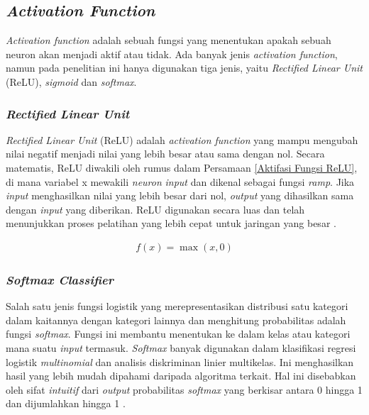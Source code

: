\subsection{\textit{Activation Function}}

\textit{Activation function} adalah sebuah fungsi yang menentukan apakah sebuah neuron akan menjadi aktif atau tidak. Ada banyak jenis \textit{activation function}, namun pada penelitian ini hanya digunakan tiga jenis, yaitu \textit{Rectified Linear Unit} (ReLU), \textit{sigmoid }dan \textit{softmax}.



\subsubsection{\textit{Rectified Linear Unit}}
    \textit{Rectified Linear Unit} (ReLU) adalah \textit{activation function} yang mampu mengubah nilai negatif menjadi nilai yang lebih besar atau sama dengan nol. Secara matematis, ReLU diwakili oleh rumus dalam Persamaan \ref{Aktifasi Fungsi ReLU}, di mana variabel x mewakili \textit{neuron} \textit{input} dan dikenal sebagai fungsi \textit{ramp}. Jika \textit{input} menghasilkan nilai yang lebih besar dari nol, \textit{output} yang dihasilkan sama dengan \textit{input} yang diberikan. ReLU digunakan secara luas dan telah menunjukkan proses pelatihan yang lebih cepat untuk jaringan yang besar \cite{Dewi2018}.


    \begin{equation}
        \begin{aligned}
            f(x) = \max(x, 0)
        \end{aligned}\label{Aktifasi Fungsi ReLU}
    \end{equation}



\subsubsection{\textit{Softmax Classifier}}

    Salah satu jenis fungsi logistik yang merepresentasikan distribusi satu kategori dalam kaitannya dengan kategori lainnya dan menghitung probabilitas adalah fungsi \textit{softmax}. Fungsi ini membantu menentukan ke dalam kelas atau kategori mana suatu \textit{input} termasuk. \textit{Softmax} banyak digunakan dalam klasifikasi regresi logistik \textit{multinomial} dan analisis diskriminan linier multikelas. Ini menghasilkan hasil yang lebih mudah dipahami daripada algoritma terkait. Hal ini disebabkan oleh sifat \textit{intuitif} dari \textit{output} probabilitas \textit{softmax }yang berkisar antara 0 hingga 1 dan dijumlahkan hingga 1 \cite{Zhang2019}.

